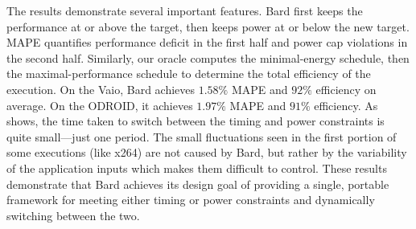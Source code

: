 The results demonstrate several important features.
Bard first keeps the performance at or above the target, then keeps power at or below the new target.
MAPE quantifies performance deficit in the first half and power cap violations in the second half.
Similarly, our oracle computes the minimal-energy schedule, then the maximal-performance schedule to determine the total efficiency of the execution.
On the Vaio, Bard achieves $1.58\%$ MAPE and $92\%$ efficiency on average.
On the ODROID, it achieves $1.97\%$ MAPE and $91\%$ efficiency.
As  shows, the time taken to switch between the timing and power constraints is quite small---just one period.
The small fluctuations seen in the first portion of some executions (like x264) are not caused by Bard, but rather by the variability of the application inputs which makes them difficult to control.
These results demonstrate that Bard achieves its design goal of providing a single, portable framework for meeting either timing or power constraints and dynamically switching between the two.
